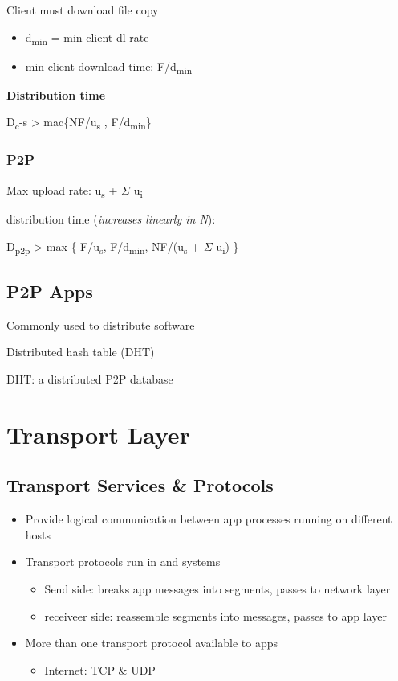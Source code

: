 \documentclass[11pt]{article}
\begin{document}
Client must download file copy
\begin{itemize}
\item d\textsubscript{min} = min client dl rate
\item min client download time: F/d\textsubscript{min}
\end{itemize}

\textbf{Distribution time}

D\textsubscript{c}-s > mac\{NF/u\textsubscript{s} , F/d\textsubscript{min}\}

\subsubsection{P2P}
\label{sec:orga08a930}

Max upload rate:  u\textsubscript{s} + \(\Sigma\) u\textsubscript{i}

distribution time (\emph{increases linearly in N}):

D\textsubscript{p2p} > max \{ F/u\textsubscript{s}, F/d\textsubscript{min}, NF/(u\textsubscript{s} + \(\Sigma\) u\textsubscript{i}) \}





\subsection{P2P Apps}
\label{sec:org48ab9dd}
Commonly used to distribute software

Distributed hash table (DHT)

DHT: a distributed P2P database


\section{Transport Layer}
\label{sec:orgb86a2ba}

\subsection{Transport Services \& Protocols}
\label{sec:orgb7f1e8d}
\begin{itemize}
\item Provide logical communication between app processes running on
different hosts
\item Transport protocols run in and systems
\begin{itemize}
\item Send side: breaks app messages into segments, passes to network layer
\item receiveer side: reassemble segments into messages, passes to app
layer
\end{itemize}
\item More than one transport protocol available to apps
\begin{itemize}
\item Internet: TCP \& UDP
\end{itemize}
\end{itemize}
\end{document}
